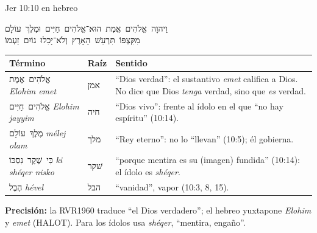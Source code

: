 \documentclass[hyperref={bookmarks=false},aspectratio=169]{beamer}
\newcommand{\heb}[1]{\mbox{\foreignlanguage{hebrew}{#1}}}
\newcommand{\precision}[1]{{\footnotesize\color{gris}\textbf{Precisión:} #1}}
\begin{document}
\begin{frame}{Jer 10:10 en hebreo}
\begin{center}
\heb{וַיהוָה אֱלֹהִים אֱמֶת הוּא־אֱלֹהִים חַיִּים וּמֶלֶךְ עוֹלָם}\\[2pt]
\heb{מִקִּצְפּוֹ תִּרְעַשׁ הָאָרֶץ וְלֹא־יָכִלוּ גוֹיִם זַעְמוֹ}
\end{center}
\renewcommand{\arraystretch}{1.12}\scriptsize
\begin{tabular}{@{}>{\RaggedRight\arraybackslash}p{2.9cm}>{\RaggedRight\arraybackslash}p{1.2cm}>{\RaggedRight\arraybackslash}p{7.7cm}@{}}
\toprule
\textbf{Término} & \textbf{Raíz} & \textbf{Sentido} \\ \midrule
\heb{אֱלֹהִים אֱמֶת} \emph{Elohim emet} & \heb{אמן} & ``Dios verdad'': el sustantivo \emph{emet} califica a Dios. No dice que Dios \emph{tenga} verdad, sino que \emph{es} verdad. \\
\heb{אֱלֹהִים חַיִּים} \emph{Elohim jayyim} & \heb{חיה} & ``Dios vivo'': frente al ídolo en el que ``no hay espíritu'' (10:14). \\
\heb{מֶלֶךְ עוֹלָם} \emph{mélej olam} & \heb{מלך} & ``Rey eterno'': no lo ``llevan'' (10:5); él gobierna. \\
\heb{כִּי שֶׁקֶר נִסְכּוֹ} \emph{ki shéqer nisko} & \heb{שׁקר} & ``porque mentira es su (imagen) fundida'' (10:14): el ídolo es \emph{shéqer}. \\
\heb{הֶבֶל} \emph{hével} & \heb{הבל} & ``vanidad'', vapor (10:3, 8, 15). \\
\bottomrule
\end{tabular}\par\smallskip
\precision{la RVR1960 traduce ``el Dios verdadero''; el hebreo yuxtapone \emph{Elohim} y \emph{emet} (HALOT). Para los ídolos usa \emph{shéqer}, ``mentira, engaño''.}
\end{frame}
\end{document}
